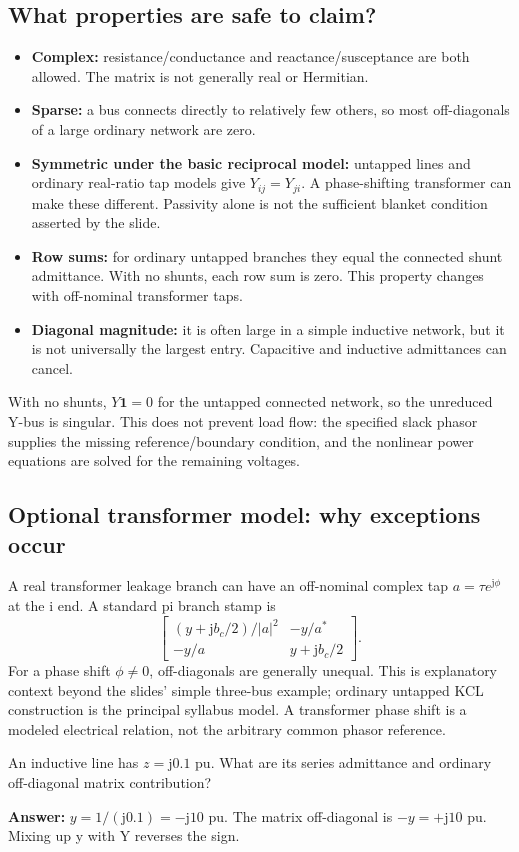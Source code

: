 \documentclass[11pt,a4paper]{article}
\newcommand{\checkq}[2]{\begin{tcolorbox}[breakable=false,colback=pale,colframe=teal,coltitle=white,title={Check your understanding}]#1\par\textbf{Answer:} #2\end{tcolorbox}}
\newcommand{\jj}{\mathrm j}
\begin{document}
\subsection{What properties are safe to claim?}
\begin{itemize}
\item \textbf{Complex:} resistance/conductance and reactance/susceptance are both allowed. The matrix is not generally real or Hermitian.
\item \textbf{Sparse:} a bus connects directly to relatively few others, so most off-diagonals of a large ordinary network are zero.
\item \textbf{Symmetric under the basic reciprocal model:} untapped lines and ordinary real-ratio tap models give $Y_{ij}=Y_{ji}$. A phase-shifting transformer can make these different. Passivity alone is not the sufficient blanket condition asserted by the slide.
\item \textbf{Row sums:} for ordinary untapped branches they equal the connected shunt admittance. With no shunts, each row sum is zero. This property changes with off-nominal transformer taps.
\item \textbf{Diagonal magnitude:} it is often large in a simple inductive network, but it is not universally the largest entry. Capacitive and inductive admittances can cancel.
\end{itemize}
With no shunts, $Y\mathbf1=0$ for the untapped connected network, so the unreduced Y-bus is singular. This does not prevent load flow: the specified slack phasor supplies the missing reference/boundary condition, and the nonlinear power equations are solved for the remaining voltages.
\subsection{Optional transformer model: why exceptions occur}
A real transformer leakage branch can have an off-nominal complex tap $a=\tau e^{\jj\phi}$ at the i end. A standard pi branch stamp is
\[
\begin{bmatrix}
(y+\jj b_c/2)/|a|^2 & -y/a^*\\
-y/a & y+\jj b_c/2
\end{bmatrix}.
\]
For a phase shift $\phi\ne0$, off-diagonals are generally unequal. This is explanatory context beyond the slides' simple three-bus example; ordinary untapped KCL construction is the principal syllabus model. A transformer phase shift is a modeled electrical relation, not the arbitrary common phasor reference.
\checkq{An inductive line has $z=\jj0.1$ pu. What are its series admittance and ordinary off-diagonal matrix contribution?}{$y=1/(\jj0.1)=-\jj10$ pu. The matrix off-diagonal is $-y=+\jj10$ pu. Mixing up y with Y reverses the sign.}
\end{document}
